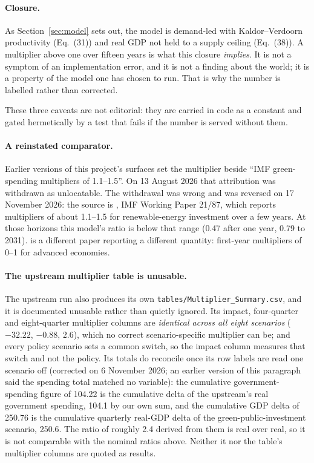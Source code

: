 \paragraph{Closure.} As Section~\ref{sec:model} sets out, the model is demand-led with Kaldor--Verdoorn productivity (Eq.~(31)) and real GDP not held to a supply ceiling (Eq.~(38)). A multiplier above one over fifteen years is what this closure \emph{implies}. It is not a symptom of an implementation error, and it is not a finding about the world; it is a property of the model one has chosen to run. That is why the number is labelled rather than corrected.

These three caveats are not editorial: they are carried in code as a constant and gated hermetically by a test that fails if the number is served without them.

\paragraph{A reinstated comparator.} Earlier versions of this project's surfaces set the multiplier beside ``IMF green-spending multipliers of 1.1--1.5''. On 13 August 2026 that attribution was withdrawn as unlocatable. The withdrawal was wrong and was reversed on 17 November 2026: the source is \citet{batini2021}, IMF Working Paper 21/87, which reports multipliers of about 1.1--1.5 for renewable-energy investment over a few years. At those horizons this model's ratio is below that range (0.47 after one year, 0.79 to 2031). \citet{batini2014} is a different paper reporting a different quantity: first-year multipliers of 0--1 for advanced economies.

\paragraph{The upstream multiplier table is unusable.} The upstream run also produces its own \texttt{tables/Multiplier\_Summary.csv}, and it is documented unusable rather than quietly ignored. Its impact, four-quarter and eight-quarter multiplier columns are \emph{identical across all eight scenarios} ($-32.22$, $-0.88$, $2.6$), which no correct scenario-specific multiplier can be; and every policy scenario sets a common switch, so the impact column measures that switch and not the policy. Its totals do reconcile once its row labels are read one scenario off (corrected on 6 November 2026; an earlier version of this paragraph said the spending total matched no variable): the cumulative government-spending figure of 104.22 is the cumulative delta of the upstream's real government spending, 104.1 by our own sum, and the cumulative GDP delta of 250.76 is the cumulative quarterly real-GDP delta of the green-public-investment scenario, 250.6. The ratio of roughly 2.4 derived from them is real over real, so it is not comparable with the nominal ratios above. Neither it nor the table's multiplier columns are quoted as results.
